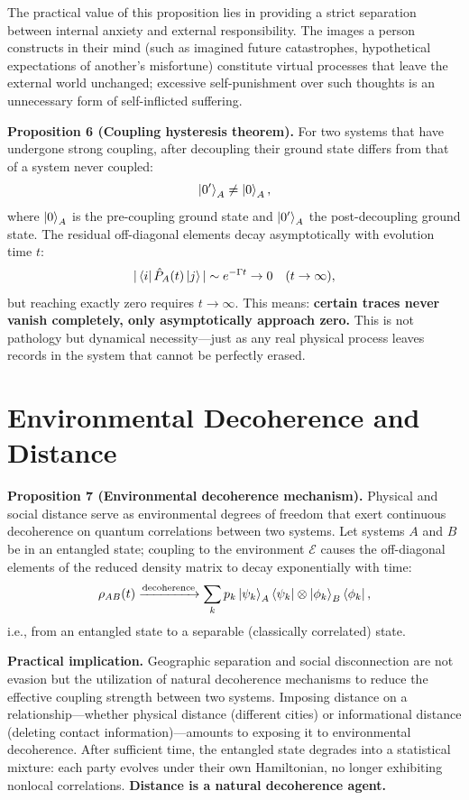 ﻿\documentclass[11pt,a4paper]{article}
\begin{document}
The practical value of this proposition lies in providing a strict separation between internal anxiety and external responsibility. The images a person constructs in their mind (such as imagined future catastrophes, hypothetical expectations of another's misfortune) constitute virtual processes that leave the external world unchanged; excessive self-punishment over such thoughts is an unnecessary form of self-inflicted suffering.

\textbf{Proposition 6 (Coupling hysteresis theorem).} For two systems that have undergone strong coupling, after decoupling their ground state differs from that of a system never coupled:
\begin{equation}
\ket{0'}_A \neq \ket{0}_A,
\end{equation}
where $\ket{0}_A$ is the pre-coupling ground state and $\ket{0'}_A$ the post-decoupling ground state. The residual off-diagonal elements decay asymptotically with evolution time $t$:
\begin{equation}
|\bra{i}\hat{P}_A(t)\ket{j}| \sim e^{-\Gamma t} \to 0 \quad (t\to\infty),
\end{equation}
but reaching exactly zero requires $t\to\infty$. This means: \textbf{certain traces never vanish completely, only asymptotically approach zero.} This is not pathology but dynamical necessity---just as any real physical process leaves records in the system that cannot be perfectly erased.

\section{Environmental Decoherence and Distance}

\textbf{Proposition 7 (Environmental decoherence mechanism).} Physical and social distance serve as environmental degrees of freedom that exert continuous decoherence on quantum correlations between two systems. Let systems $A$ and $B$ be in an entangled state; coupling to the environment $\mathcal{E}$ causes the off-diagonal elements of the reduced density matrix to decay exponentially with time:
\begin{equation}
\rho_{AB}(t) \xrightarrow{\text{decoherence}} \sum_k p_k \ket{\psi_k}_A\bra{\psi_k} \otimes \ket{\phi_k}_B\bra{\phi_k},
\end{equation}
i.e., from an entangled state to a separable (classically correlated) state.

\textbf{Practical implication.} Geographic separation and social disconnection are not evasion but the utilization of natural decoherence mechanisms to reduce the effective coupling strength between two systems. Imposing distance on a relationship---whether physical distance (different cities) or informational distance (deleting contact information)---amounts to exposing it to environmental decoherence. After sufficient time, the entangled state degrades into a statistical mixture: each party evolves under their own Hamiltonian, no longer exhibiting nonlocal correlations. \textbf{Distance is a natural decoherence agent.}
\end{document}
